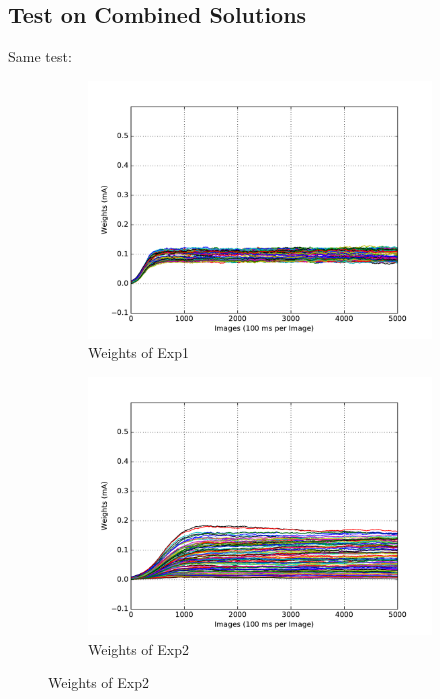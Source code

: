 \subsection{Test on Combined Solutions}
Same test:
\begin{figure}
	\centering
	\begin{subfigure}[t]{0.4\textwidth}
		\includegraphics[width=\textwidth]{pics_sdlm/07_exp_SAE_all_long/exp1_weights_s.pdf}
		\caption{Weights of Exp1}
	\end{subfigure}
	\begin{subfigure}[t]{0.4\textwidth}
		\includegraphics[width=\textwidth]{pics_sdlm/07_exp_SAE_all_long/exp2_weights_s.pdf}
		\caption{Weights of Exp2}
	\end{subfigure}

\end{figure}
